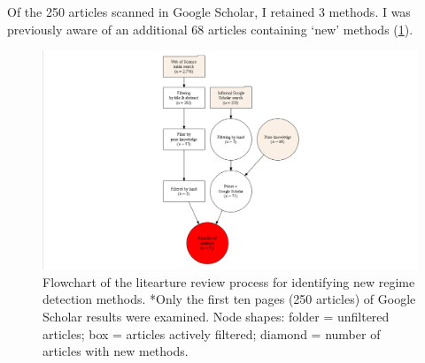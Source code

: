 \documentclass[12pt,twoside,openany]{reedthesis}
\begin{document}
Of the 250 articles scanned in Google Scholar, I retained 3 methods. I
was previously aware of an additional 68 articles containing `new'
methods (\ref{fig:rdmReviewFlow}).
\begin{figure}
\includegraphics[width=0.95\linewidth]{./chapterFiles/rdmReview/figures/figsCalledInDiss/myDiagraph} \caption{Flowchart of the litearture review process for identifying new regime detection methods. *Only the first ten pages (250 articles) of Google Scholar results were examined. Node shapes: folder = unfiltered articles; box = articles actively filtered; diamond = number of articles with new methods.}\label{fig:rdmReviewFlow}
\end{figure}
\end{document}
